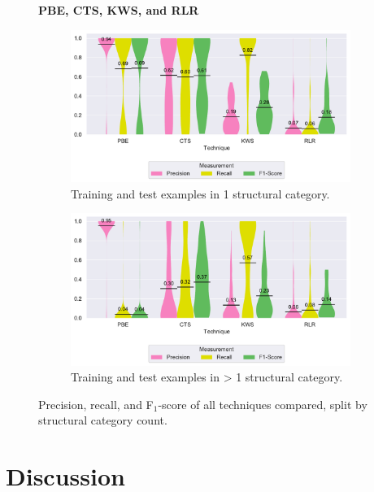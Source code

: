 \begin{figure}
\centering
    \textbf{PBE, CTS, KWS, and RLR}\par\medskip
\begin{subfigure}[b]{\columnwidth}
		\centering
				\includegraphics[width=\columnwidth,
				clip]{img/big-study/recall-precision-singlecategory-all.pdf}
		\caption{Training and test examples in 1
		structural category.}
		\label{fig:recall-precision-singlecategory-all}
\end{subfigure}\hspace{\fill}
\begin{subfigure}[b]{\columnwidth}
		\centering
				\centering
		\includegraphics[width=\columnwidth,
		clip]{img/big-study/recall-precision-multicategory-all.pdf}
		\caption{Training and test examples in \textgreater
		1 structural
		category.}
		\label{fig:recall-precision-multicategory-all}
\end{subfigure}
\caption{Precision, recall, and F$_{1}$-score of all
techniques compared, split by structural category count.}
\end{figure}

\section{Discussion}
\label{sec:discussion}

